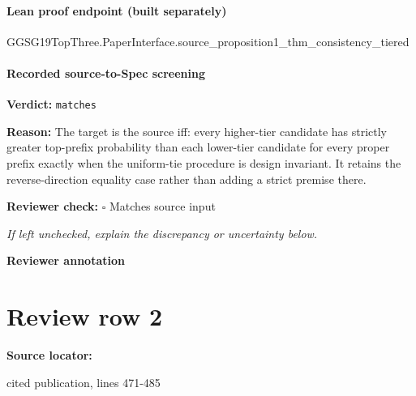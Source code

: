 \documentclass[10pt]{article}
\newcommand{\reviewerbox}{%
  \par\noindent\fbox{\parbox{0.96\linewidth}{\rule{0pt}{0.38in}}}\par
}
\newcommand{\reviewmatch}[1]{%
  \par\noindent\textbf{Reviewer check:} $\square$\; #1\par
  \noindent\emph{If left unchecked, explain the discrepancy or uncertainty below.}\par
}
\begin{document}
\paragraph{Lean proof endpoint (built separately)}\begin{ReviewVerbatim}
GGSG19TopThree.PaperInterface.source_proposition1_thm_consistency_tiered
\end{ReviewVerbatim}

\paragraph{Recorded source-to-Spec screening}
\textbf{Verdict:} \texttt{matches}
\\
{\raggedright
\textbf{Reason:} The target is the source iff:\allowbreak{} every higher-\allowbreak{}tier candidate has strictly greater top-\allowbreak{}prefix probability than each lower-\allowbreak{}tier candidate for every proper prefix exactly when the uniform-\allowbreak{}tie procedure is design invariant.\allowbreak{} It retains the reverse-\allowbreak{}direction equality case rather than adding a strict premise there.\allowbreak{}
\par}
\reviewmatch{Matches source input}
\noindent\textbf{Reviewer annotation}\par
\reviewerbox
\clearpage
\hypertarget{source-claim-c74374c73696b398}{}
\section*{Review row 2}
\textbf{Source locator:} {\footnotesize\raggedright cited publication, lines 471-\allowbreak{}485\par}
\end{document}
